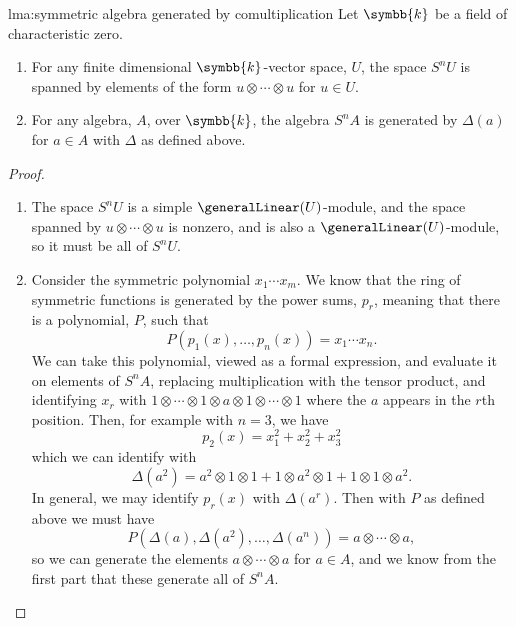 \documentclass[fleqn]{NotesClass}
\renewcommand{\field}{\symbb{k}}
\begin{document}
    \begin{lma}{}{lma:symmetric algebra generated by comultiplication}
        Let \(\field\) be a field of characteristic zero.
        \begin{enumerate}
            \item For any finite dimensional \(\field\)-vector space, \(U\), the space \(S^nU\) is spanned by elements of the form \(u \otimes \dotsb \otimes u\) for \(u \in U\).
            \item For any algebra, \(A\), over \(\field\), the algebra \(S^nA\) is generated by \(\Delta(a)\) for \(a \in A\) with \(\Delta\) as defined above.
        \end{enumerate}
        \begin{proof}
            \begin{enumerate}
                \item The space \(S^nU\) is a simple \(\generalLinear(U)\)-module, and the space spanned by \(u \otimes \dotsb \otimes u\) is nonzero, and is also a \(\generalLinear(U)\)-module, so it must be all of \(S^nU\).
                \item Consider the symmetric polynomial \(x_1 \dotsm x_m\).
                We know that the ring of symmetric functions is generated by the power sums, \(p_r\), meaning that there is a polynomial, \(P\), such that
                \begin{equation}
                    P(p_1(x), \dotsc, p_n(x)) = x_1 \dotsm x_n.
                \end{equation}
                We can take this polynomial, viewed as a formal expression, and evaluate it on elements of \(S^nA\), replacing multiplication with the tensor product, and identifying \(x_r\) with \(1 \otimes \dotsb \otimes 1 \otimes a \otimes 1 \otimes \dotsb \otimes 1\) where the \(a\) appears in the \(r\)th position.
                Then, for example with \(n = 3\), we have
                \begin{equation}
                    p_2(x) = x_1^2 + x_2^2 + x_3^2
                \end{equation}
                which we can identify with
                \begin{equation}
                    \Delta(a^2) = a^2 \otimes 1 \otimes 1 + 1 \otimes a^2 \otimes 1 + 1 \otimes 1 \otimes a^2.
                \end{equation}
                In general, we may identify \(p_r(x)\) with \(\Delta(a^r)\).
                Then with \(P\) as defined above we must have
                \begin{equation}
                    P(\Delta(a), \Delta(a^2), \dotsc, \Delta(a^n)) = a \otimes \dotsb \otimes a,
                \end{equation}
                so we can generate the elements \(a \otimes \dotsb \otimes a\) for \(a \in A\), and we know from the first part that these generate all of \(S^nA\).
            \end{enumerate}
        \end{proof}
    \end{lma}
    
\end{document}
